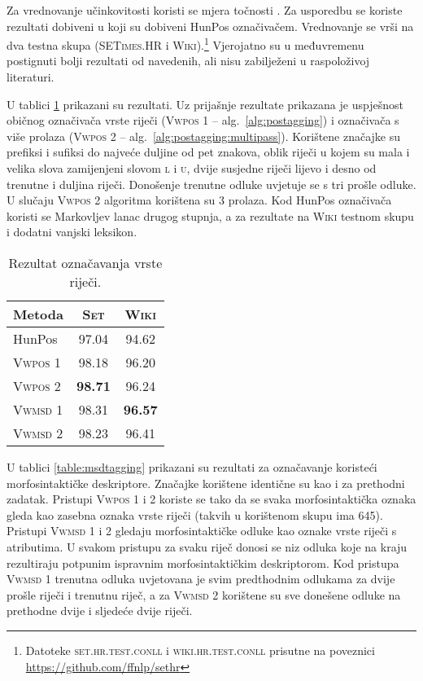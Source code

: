 Za vrednovanje učinkovitosti koristi se mjera točnosti . Za
usporedbu se koriste rezultati dobiveni u \citep{agic2013lemmatization} koji su
dobiveni HunPos označivačem. Vrednovanje se vrši na dva testna skupa
(\textsc{SETimes.HR} i \textsc{Wiki}).\footnote{Datoteke
\textsc{set.hr.test.conll} i \textsc{wiki.hr.test.conll} prisutne na poveznici
\url{https://github.com/ffnlp/sethr}} Vjerojatno su u međuvremenu postignuti
bolji rezultati od navedenih, ali nisu zabilježeni u raspoloživoj literaturi.

U tablici \ref{table:postagging} prikazani su rezultati. Uz prijašnje rezultate
prikazana je uspješnost običnog označivača vrste riječi (\textsc{Vwpos 1} --
alg.~\ref{alg:postagging}) i označivača s više prolaza (\textsc{Vwpos 2} --
alg.~\ref{alg:postagging:multipass}). Korištene značajke su prefiksi i sufiksi
do najveće duljine od pet znakova, oblik riječi u kojem su mala i velika slova
zamijenjeni slovom \textsc{l} i \textsc{u}, dvije susjedne riječi lijevo i desno
od trenutne i duljina riječi. Donošenje trenutne odluke uvjetuje se s tri prošle
odluke. U slučaju \textsc{Vwpos 2} algoritma korištena su 3 prolaza. Kod HunPos
označivača koristi se Markovljev lanac drugog stupnja, a za rezultate na
\textsc{Wiki} testnom skupu i dodatni vanjski leksikon.

\begin{table}[]
\centering
\caption[Rezultat označavanja vrste riječi.]{Rezultat označavanja vrste riječi.}
\label{table:postagging}
\begin{tabular}{|l|c|c|}
\hline
Metoda             & \textsc{Set}   & \textsc{Wiki}  \\ \hline \hline
HunPos             & 97.04          & 94.62          \\
\textsc{Vwpos 1}   & 98.18          & 96.20          \\
\textsc{Vwpos 2}   & \textbf{98.71} & 96.24          \\
\textsc{Vwmsd} 1   & 98.31          & \textbf{96.57} \\
\textsc{Vwmsd} 2   & 98.23          & 96.41          \\ \hline
\end{tabular}
\end{table}

U tablici \ref{table:msdtagging} prikazani su rezultati za označavanje koristeći
morfosintaktičke deskriptore. Značajke korištene identične su kao i za prethodni
zadatak. Pristupi \textsc{Vwpos 1} i \textsc{2} koriste se tako da se svaka
morfosintaktička oznaka gleda kao zasebna oznaka vrste riječi (takvih u
korištenom skupu ima 645). Pristupi \textsc{Vwmsd} 1 i 2 gledaju
morfosintaktičke odluke kao oznake vrste riječi s atributima. U svakom pristupu
za svaku riječ donosi se niz odluka koje na kraju rezultiraju potpunim ispravnim
morfosintaktičkim deskriptorom.  Kod pristupa \textsc{Vwmsd 1} trenutna odluka
uvjetovana je svim predthodnim odlukama za dvije prošle riječi i trenutnu riječ,
a za \textsc{Vwmsd 2} korištene su sve donešene odluke na prethodne dvije i
sljedeće dvije riječi.

